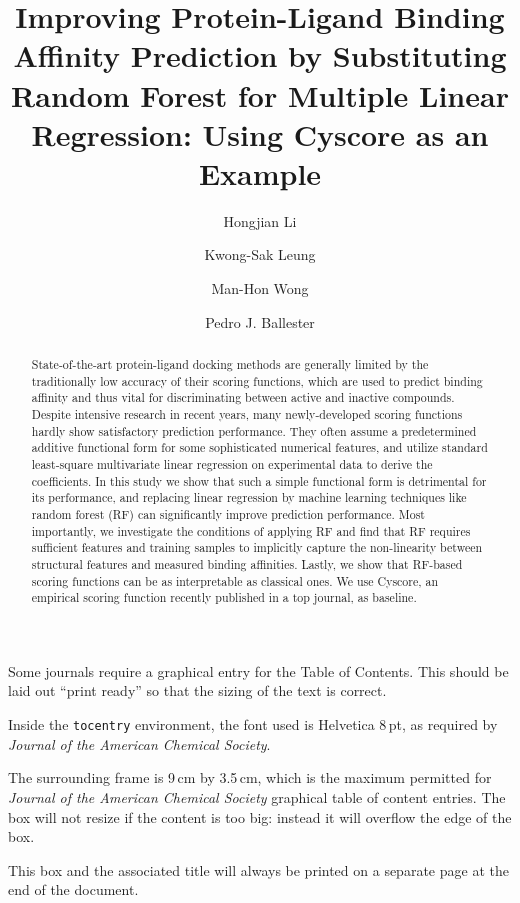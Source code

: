 \documentclass[journal=jacsat,manuscript=article]{achemso}
\author{Hongjian Li}
\author{Kwong-Sak Leung}
\author{Man-Hon Wong}
\affiliation[Chinese University of Hong Kong]
{Department of Computer Science and Engineering, Chinese University of Hong Kong, Shatin, New Territories, Hong Kong}
\author{Pedro J. Ballester}
\affiliation[European Bioinformatics Institute]
{European Bioinformatics Institute, Wellcome Trust Genome Campus, Hinxton, Cambridge - CB10 1SD, UK}
\title[RF::Cyscore]{Improving Protein-Ligand Binding Affinity Prediction by Substituting Random Forest for Multiple Linear Regression: Using Cyscore as an Example}
\begin{document}
\begin{tocentry}

Some journals require a graphical entry for the Table of Contents.
This should be laid out ``print ready'' so that the sizing of the
text is correct.

Inside the \texttt{tocentry} environment, the font used is Helvetica
8\,pt, as required by \emph{Journal of the American Chemical
Society}.

The surrounding frame is 9\,cm by 3.5\,cm, which is the maximum
permitted for  \emph{Journal of the American Chemical Society}
graphical table of content entries. The box will not resize if the
content is too big: instead it will overflow the edge of the box.

This box and the associated title will always be printed on a
separate page at the end of the document.

\end{tocentry}

\begin{abstract}

State-of-the-art protein-ligand docking methods are generally limited by the traditionally low accuracy of their scoring functions, which are used to predict binding affinity and thus vital for discriminating between active and inactive compounds. Despite intensive research in recent years, many newly-developed scoring functions hardly show satisfactory prediction performance. They often assume a predetermined additive functional form for some sophisticated numerical features, and utilize standard least-square multivariate linear regression on experimental data to derive the coefficients. In this study we show that such a simple functional form is detrimental for its performance, and replacing linear regression by machine learning techniques like random forest (RF) can significantly improve prediction performance. Most importantly, we investigate the conditions of applying RF and find that RF requires sufficient features and training samples to implicitly capture the non-linearity between structural features and measured binding affinities. Lastly, we show that RF-based scoring functions can be as interpretable as classical ones. We use Cyscore, an empirical scoring function recently published in a top journal, as baseline.

\end{abstract}
\end{document}
